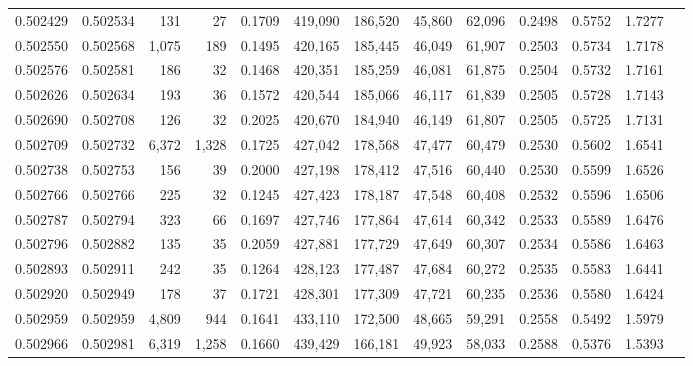 \begin{tabular}{rrrrrrrrrrrrr}
0.502429 & 0.502534 &   131 &    27 &                                     0.1709 & 419,090 & 186,520 &  45,860 &  62,096 & 0.2498 & 0.5752 & 1.7277 \\
0.502550 & 0.502568 & 1,075 &   189 &                                     0.1495 & 420,165 & 185,445 &  46,049 &  61,907 & 0.2503 & 0.5734 & 1.7178 \\
0.502576 & 0.502581 &   186 &    32 &                                     0.1468 & 420,351 & 185,259 &  46,081 &  61,875 & 0.2504 & 0.5732 & 1.7161 \\
0.502626 & 0.502634 &   193 &    36 &                                     0.1572 & 420,544 & 185,066 &  46,117 &  61,839 & 0.2505 & 0.5728 & 1.7143 \\
0.502690 & 0.502708 &   126 &    32 &                                     0.2025 & 420,670 & 184,940 &  46,149 &  61,807 & 0.2505 & 0.5725 & 1.7131 \\
0.502709 & 0.502732 & 6,372 & 1,328 &                                     0.1725 & 427,042 & 178,568 &  47,477 &  60,479 & 0.2530 & 0.5602 & 1.6541 \\
0.502738 & 0.502753 &   156 &    39 &                                     0.2000 & 427,198 & 178,412 &  47,516 &  60,440 & 0.2530 & 0.5599 & 1.6526 \\
0.502766 & 0.502766 &   225 &    32 &                                     0.1245 & 427,423 & 178,187 &  47,548 &  60,408 & 0.2532 & 0.5596 & 1.6506 \\
0.502787 & 0.502794 &   323 &    66 &                                     0.1697 & 427,746 & 177,864 &  47,614 &  60,342 & 0.2533 & 0.5589 & 1.6476 \\
0.502796 & 0.502882 &   135 &    35 &                                     0.2059 & 427,881 & 177,729 &  47,649 &  60,307 & 0.2534 & 0.5586 & 1.6463 \\
0.502893 & 0.502911 &   242 &    35 &                                     0.1264 & 428,123 & 177,487 &  47,684 &  60,272 & 0.2535 & 0.5583 & 1.6441 \\
0.502920 & 0.502949 &   178 &    37 &                                     0.1721 & 428,301 & 177,309 &  47,721 &  60,235 & 0.2536 & 0.5580 & 1.6424 \\
0.502959 & 0.502959 & 4,809 &   944 &                                     0.1641 & 433,110 & 172,500 &  48,665 &  59,291 & 0.2558 & 0.5492 & 1.5979 \\
0.502966 & 0.502981 & 6,319 & 1,258 &                                     0.1660 & 439,429 & 166,181 &  49,923 &  58,033 & 0.2588 & 0.5376 & 1.5393 \\

\end{tabular}

